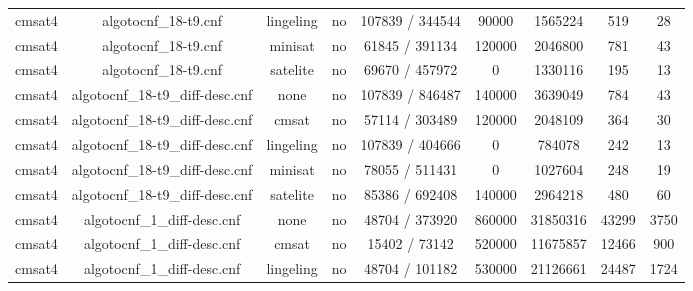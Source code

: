 \begin{appendices}
{\begin{table}[p]
\begin{center}
\begin{tabular}{l|cccccccc}
  cmsat4                         & algotocnf\_18-t9.cnf           & lingeling  & no    & 107839 / 344544 & 90000     & 1565224   & 519        & 28 \\ %
  cmsat4                         & algotocnf\_18-t9.cnf           & minisat    & no    & 61845 / 391134 & 120000    & 2046800   & 781        & 43 \\ %
  cmsat4                         & algotocnf\_18-t9.cnf           & satelite   & no    & 69670 / 457972 & 0         & 1330116   & 195        & 13 \\ %
  cmsat4                         & algotocnf\_18-t9\_diff-desc.cnf & none       & no    & 107839 / 846487 & 140000    & 3639049   & 784        & 43 \\ %
  cmsat4                         & algotocnf\_18-t9\_diff-desc.cnf & cmsat      & no    & 57114 / 303489 & 120000    & 2048109   & 364        & 30 \\ %
  cmsat4                         & algotocnf\_18-t9\_diff-desc.cnf & lingeling  & no    & 107839 / 404666 & 0         & 784078    & 242        & 13 \\ %
  cmsat4                         & algotocnf\_18-t9\_diff-desc.cnf & minisat    & no    & 78055 / 511431 & 0         & 1027604   & 248        & 19 \\ %
  cmsat4                         & algotocnf\_18-t9\_diff-desc.cnf & satelite   & no    & 85386 / 692408 & 140000    & 2964218   & 480        & 60 \\ %
  cmsat4                         & algotocnf\_1\_diff-desc.cnf    & none       & no    & 48704 / 373920 & 860000    & 31850316  & 43299      & 3750 \\ %
  cmsat4                         & algotocnf\_1\_diff-desc.cnf    & cmsat      & no    & 15402 / 73142 & 520000    & 11675857  & 12466      & 900 \\ %
  cmsat4                         & algotocnf\_1\_diff-desc.cnf    & lingeling  & no    & 48704 / 101182 & 530000    & 21126661  & 24487      & 1724 \\ %

\end{tabular}
\end{center}
\end{table}}
\end{appendices}
